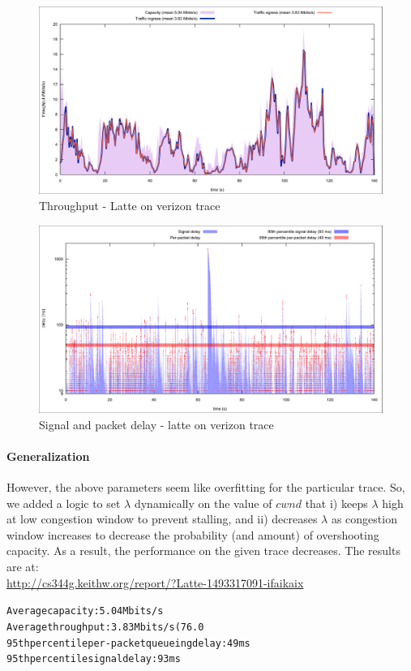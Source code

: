 \documentclass{article}
\begin{document}
\begin{figure}[h]
\includegraphics[width=1.2\columnwidth]{"tput"}
\caption{Throughput - Latte on verizon trace}
\label{tput}
\end{figure}

\begin{figure}[h]
\includegraphics[width=1.2\columnwidth]{"delay"}
\caption{Signal and packet delay - latte on verizon trace}
\label{delay}
\end{figure}


\paragraph{Generalization} However, the above parameters seem like
overfitting for the particular trace. So, we added a logic to set
$\lambda$ dynamically on the value of $cwnd$ that i) keeps
$\lambda$ high at low congestion window to prevent stalling, and ii)
decreases $\lambda$ as congestion window increases to decrease the
probability (and amount) of overshooting capacity. As a result, the
performance on the given trace decreases. The results are at:\\
\url{http://cs344g.keithw.org/report/?Latte-1493317091-ifaikaix}
\begin{alltt}
Average capacity: 5.04 Mbits/s
Average throughput: 3.83 Mbits/s (76.0%
95th percentile per-packet queueing delay: 49 ms
95th percentile signal delay: 93 ms
\end{alltt}
\end{document}
